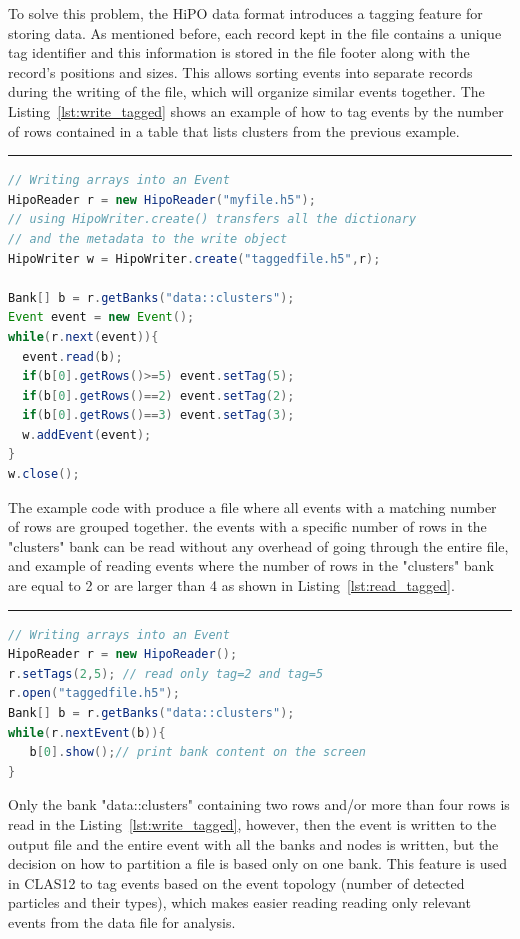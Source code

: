To solve this problem, the HiPO data format introduces a tagging feature for storing data. As mentioned before, each record kept in the file contains a unique
tag identifier and this information is stored in the file footer along with the record's positions and sizes. This allows sorting events into separate records during
the writing of the file, which will organize similar events together. The Listing~\ref{lst:write_tagged} shows an example of how to tag events by the number of rows contained in a table that lists clusters from the previous example. 

\rule{16.5cm}{0.4pt}
\begin{lstlisting}[language=java, caption=Java example to create and write primitive types into an event, label=lst:write_tagged]
// Writing arrays into an Event
HipoReader r = new HipoReader("myfile.h5");
// using HipoWriter.create() transfers all the dictionary
// and the metadata to the write object
HipoWriter w = HipoWriter.create("taggedfile.h5",r);

Bank[] b = r.getBanks("data::clusters");
Event event = new Event();
while(r.next(event)){
  event.read(b);
  if(b[0].getRows()>=5) event.setTag(5);
  if(b[0].getRows()==2) event.setTag(2);
  if(b[0].getRows()==3) event.setTag(3);
  w.addEvent(event);
}
w.close();
\end{lstlisting}

The example code with produce a file where all events with a matching number of rows are grouped together. the events with a specific number of
rows in the "clusters" bank can be read without any overhead of going through the entire file, and example of reading events where the number of
rows in the "clusters" bank are equal to 2 or are larger than 4 as shown in Listing~\ref{lst:read_tagged}.

\rule{16.5cm}{0.4pt}
\begin{lstlisting}[language=java, caption=Java example to sort events in the output file depending on number of rows in the table, label=lst:read_tagged]
// Writing arrays into an Event
HipoReader r = new HipoReader();
r.setTags(2,5); // read only tag=2 and tag=5
r.open("taggedfile.h5");
Bank[] b = r.getBanks("data::clusters");
while(r.nextEvent(b)){
   b[0].show();// print bank content on the screen
}
\end{lstlisting}

Only the bank "data::clusters" containing two rows and/or more than four rows is read in the Listing~\ref{lst:write_tagged}, however, then the event is written to the output file and the entire event with all the banks and nodes is written, but the decision on how to partition a file is based only on one bank. 
This feature is used in CLAS12 to tag events based on the event topology (number of detected particles and their types), which makes easier reading reading 
only relevant events from the data file for analysis.


